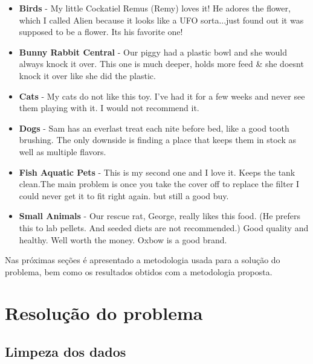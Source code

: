 \documentclass[conference]{IEEEtran}
\begin{document}
\begin{itemize}
	\item \textbf{Birds} - My little Cockatiel Remus (Remy) loves it! He adores the flower, which I called Alien because it looks like a UFO sorta...just found out it was supposed to be a flower. Its his favorite one!
	
	\item \textbf{Bunny Rabbit Central} - Our piggy had a plastic bowl and she would always knock it over. This one is much deeper, holds more feed \& she doesnt knock it over like she did the plastic.
	
	\item \textbf{Cats} - My cats do not like this toy. I've had it for a few weeks and never see them playing with it. I would not recommend it.
	
	\item \textbf{Dogs} - Sam has an everlast treat each nite before bed, like a good tooth brushing. The only downside is finding a place that keeps them in stock as well as multiple flavors.
	
	\item \textbf{Fish Aquatic Pets} - This is my second one and I love it. Keeps the tank clean.The main problem is once you take the cover off to replace the filter I could never get it to fit right again. but still a good buy.
	
	\item \textbf{Small Animals} - Our rescue rat, George, really likes this food. (He prefers this to lab pellets. And seeded diets are not recommended.) Good quality and healthy. Well worth the money. Oxbow is a good brand.
	
\end{itemize}

Nas próximas seções é apresentado a metodologia usada para a solução do problema, bem como os resultados obtidos com a metodologia proposta.

\section{Resolução do problema}

	\subsection{Limpeza dos dados}\label{sec:CleanData}
	
\end{document}
